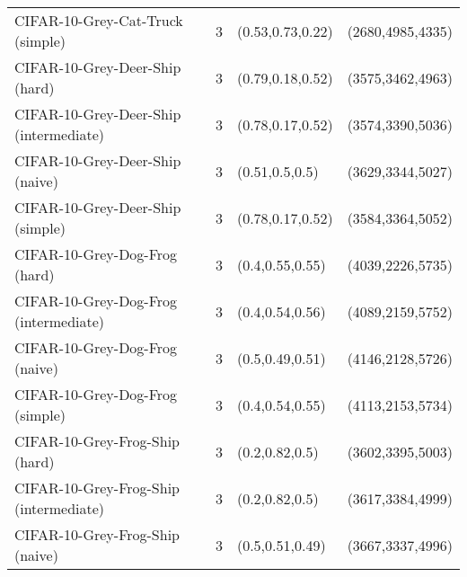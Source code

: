 \begin{tabular}{llll}
                CIFAR-10-Grey-Cat-Truck (simple) &              3 &                                    (0.53,0.73,0.22) &                                               (2680,4985,4335) \\
                  CIFAR-10-Grey-Deer-Ship (hard) &              3 &                                    (0.79,0.18,0.52) &                                               (3575,3462,4963) \\
          CIFAR-10-Grey-Deer-Ship (intermediate) &              3 &                                    (0.78,0.17,0.52) &                                               (3574,3390,5036) \\
                 CIFAR-10-Grey-Deer-Ship (naive) &              3 &                                      (0.51,0.5,0.5) &                                               (3629,3344,5027) \\
                CIFAR-10-Grey-Deer-Ship (simple) &              3 &                                    (0.78,0.17,0.52) &                                               (3584,3364,5052) \\
                   CIFAR-10-Grey-Dog-Frog (hard) &              3 &                                     (0.4,0.55,0.55) &                                               (4039,2226,5735) \\
           CIFAR-10-Grey-Dog-Frog (intermediate) &              3 &                                     (0.4,0.54,0.56) &                                               (4089,2159,5752) \\
                  CIFAR-10-Grey-Dog-Frog (naive) &              3 &                                     (0.5,0.49,0.51) &                                               (4146,2128,5726) \\
                 CIFAR-10-Grey-Dog-Frog (simple) &              3 &                                     (0.4,0.54,0.55) &                                               (4113,2153,5734) \\
                  CIFAR-10-Grey-Frog-Ship (hard) &              3 &                                      (0.2,0.82,0.5) &                                               (3602,3395,5003) \\
          CIFAR-10-Grey-Frog-Ship (intermediate) &              3 &                                      (0.2,0.82,0.5) &                                               (3617,3384,4999) \\
                 CIFAR-10-Grey-Frog-Ship (naive) &              3 &                                     (0.5,0.51,0.49) &                                               (3667,3337,4996) \\

\end{tabular}

